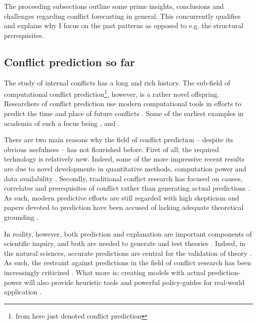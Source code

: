 \documentclass[a4paper]{article}
\begin{document}
The proceeding subsections outline some prime insights, conclusions and challenges regarding conflict forecasting in general. This concurrently qualifies and explains why I focus on the past patterns as opposed to e.g. the structural prerequisites.\par

\subsection{Conflict prediction so far}

The study of internal conflicts has a long and rich history. The sub-field of computational conflict prediction\footnote{from here just denoted conflict prediction}, however, is a rather novel offspring. Researchers of conflict prediction use modern computational tools in efforts to predict the time and place of future conflicts \citep{cederman2017predicting, chadefaux2017conflict}. Some of the earliest examples in academia of such a focus being \cite{Goldstone_2010}, \cite{Hegre2013} and \cite{perry_2013}.\par

There are two main reasons why the field of conflict prediction -- despite its obvious usefulness -- has not flourished before. First of all; the required technology is relatively new. Indeed, some of the more impressive recent results are due to novel developments in quantitative methods, computation power and data availability \citep{ol2010afghanistan, perry_2013}. Secondly, traditional conflict research has focused on causes, correlates and prerequisites of conflict rather than generating actual predictions \citep[8]{chadefaux2017conflict}. As such, modern predictive efforts are still regarded with high skepticism and papers devoted to prediction have been accused of lacking adequate theoretical grounding \citep[8-9]{chadefaux2017conflict}. 

In reality, however, both prediction and explanation are important components of scientific inquiry, and both are needed to generate and test theories \citep{Schrodt_2014, chadefaux2017conflict}. Indeed, in the natural sciences, accurate predictions are central for the validation of theory \citep[289]{Schrodt_2014}. As such, the restraint against predictions in the field of conflict research has been increasingly criticized \citep{King_Zeng_2001, Ward_Greenhill_Bakke_2010, Goldstone_2010, Schrodt_2014, chadefaux2017conflict}. What more is; creating models with actual prediction-power will also provide heuristic tools and powerful policy-guides for real-world application \citep[372]{Ward_Greenhill_Bakke_2010}.\par
\end{document}
